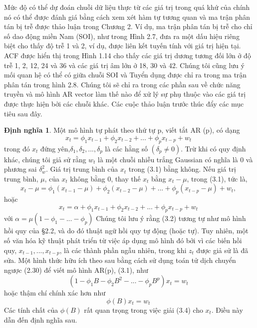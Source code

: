 \documentclass[12pt, a4paper,oneside]{book}
\theoremstyle{definition}
\newtheorem{dn}[theo]{Định nghĩa}
\begin{document}
Mức độ có thể dự đoán chuỗi dữ liệu thực từ các giá trị trong quá khứ của chính nó có thể được đánh giá bằng cách xem xét hàm tự tương quan và ma trận phân tán bị trễ được thảo luận trong Chương 2. Ví dụ, ma trận phân tán bị trễ cho chỉ số dao động miền Nam (SOI), như trong Hình 2.7, đưa ra một dấu hiệu riêng biệt cho thấy độ trễ 1 và 2, ví dụ, được liên kết tuyến tính với giá trị hiện tại. ACF được hiển thị trong Hình 1.14 cho thấy các giá trị dương tương đối lớn ở độ trễ 1, 2, 12, 24 và 36 và các giá trị âm lớn ở 18, 30 và 42. Chúng tôi cũng lưu ý mối quan hệ có thể có giữa chuỗi SOI và Tuyển dụng được chỉ ra trong ma trận phân tán trong hình 2.8. Chúng tôi sẽ chỉ ra trong các phần sau về chức năng truyền và mô hình AR vector làm thế nào để xử lý sự phụ thuộc vào các giá trị được thực hiện bởi các chuỗi khác. Các cuộc thảo luận trước thúc đẩy các mục tiêu sau đây.
\begin{dn}
	Một mô hình tự phát theo thứ tự p, viết tắt AR (p), có dạng
	$$x_{t} = \phi_{1}x_{t-1} + \phi_{2}x_{t-2} + ...+ \phi_{p}x_{t-p}+ w_{t}$$
	trong đó $x_{t}$ đứng yên,$ \delta_{1}, \delta_{2}, ..., \delta_{p}$ là các hằng số $(\delta_{p} \neq 0)$. Trừ khi có quy định khác, chúng tôi giả sử rằng $w_{t}$ là một chuỗi nhiễu trắng Gaussian có nghĩa là 0 và phương sai $\delta_{w}^{2}$. Giá trị trung bình của $x_{t}$ trong (3.1) bằng không. Nếu giá trị trung bình, $\mu$, của $x_{t}$ không bằng 0, thay thế $x_{t}$ bằng $x_{t} − \mu$, trong (3.1), tức là,
	$$x_{t} − \mu= \phi_{1}(x_{t-1} - \mu) + \phi_{2}(x_{t-2}-\mu) + ...+\phi_{p}(x_{t-p}- \mu) +w_{t},$$
	hoặc
	$$x_{t}= \alpha + \phi_{1}x_{t-1} + \phi_{2}x_{t-2}+...+ \phi_{p}x_{t-p}+ w_{t}$$ 
	với $\alpha = \mu(1-\phi_{1}-...-\phi_{p})$
	Chúng tôi lưu ý rằng (3.2) tương tự như mô hình hồi quy của §2.2, và do đó thuật ngữ hồi quy tự động (hoặc tự). Tuy nhiên, một số văn hóa kỹ thuật phát triển từ việc áp dụng mô hình đó bởi vì các biến hồi quy, $x_{t-1}, ..., x_{t-p}$, là các thành phần ngẫu nhiên, trong khi  $z_{t}$ được giả sử là đã sửa. Một hình thức hữu ích theo sau bằng cách sử dụng toán tử dịch chuyển ngược (2.30) để viết mô hình AR(p), (3.1), như
	$$(1-\phi_{1}B - \phi_{2}B^{2}- ...- \phi_{p}B^{p})x_{t}= w_{t}$$
	hoặc thậm chí chính xác hơn như 
	$$\phi(B)x_{t}= w_{t}$$
	Các tính chất của $\phi(B)$ rất quan trọng trong việc giải (3.4) cho $x_{t}$. Điều này dẫn đến định nghĩa sau.
\end{dn}
\end{document}
